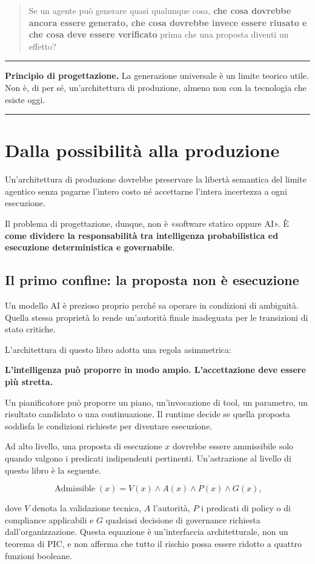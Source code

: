 \documentclass[10pt,oneside,openany]{book}
\newcommand{\principle}[1]{%
  \vspace{4pt}
  \noindent\begin{minipage}{\linewidth}
  \hrule\vspace{5pt}
  \small\sffamily\raggedright\textbf{Principio di progettazione.} #1
  \vspace{5pt}\hrule
  \end{minipage}\vspace{4pt}
}
\begin{document}
\begin{quote}
Se un agente può generare quasi qualunque cosa, \textbf{che cosa dovrebbe ancora essere generato, che cosa dovrebbe invece essere riusato e che cosa deve essere verificato} prima che una proposta diventi un effetto?
\end{quote}

\principle{La generazione universale è un limite teorico utile. Non è, di per sé, un'architettura di produzione, almeno non con la tecnologia che esiste oggi.}

\chapter{Dalla possibilità alla produzione}

Un'architettura di produzione dovrebbe preservare la libertà semantica del limite agentico senza pagarne l'intero costo né accettarne l'intera incertezza a ogni esecuzione.

Il problema di progettazione, dunque, non è «software statico oppure AI». È \textbf{come dividere la responsabilità tra intelligenza probabilistica ed esecuzione deterministica e governabile}.

\section{Il primo confine: la proposta non è esecuzione}

Un modello AI è prezioso proprio perché sa operare in condizioni di ambiguità. Quella stessa proprietà lo rende un'autorità finale inadeguata per le transizioni di stato critiche.

L'architettura di questo libro adotta una regola asimmetrica:

\begin{center}
\sffamily\bfseries
L'intelligenza può proporre in modo ampio. L'accettazione deve essere più stretta.
\end{center}

Un pianificatore può proporre un piano, un'invocazione di tool, un parametro, un risultato candidato o una continuazione. Il runtime decide se quella proposta soddisfa le condizioni richieste per diventare esecuzione.

Ad alto livello, una proposta di esecuzione $x$ dovrebbe essere ammissibile solo quando valgono i predicati indipendenti pertinenti. Un'astrazione al livello di questo libro è la seguente.
\begin{formulabox}
\[
\operatorname{Admissible}(x)
=
V(x)\land A(x)\land P(x)\land G(x),
\]
\end{formulabox}
dove $V$ denota la validazione tecnica, $A$ l'autorità, $P$ i predicati di policy o di compliance applicabili e $G$ qualsiasi decisione di governance richiesta dall'organizzazione. Questa equazione è un'interfaccia architetturale, non un teorema di PIC, e non afferma che tutto il rischio possa essere ridotto a quattro funzioni booleane.
\end{document}
